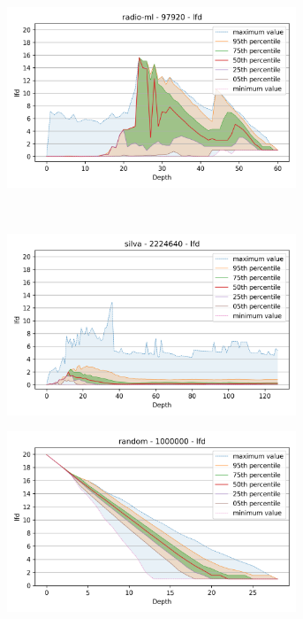 \begin{figure}
\begin{subfigure}[b]{0.47\textwidth}
    \label{fig:results:sift-lfd}
    \end{subfigure}%
    \begin{subfigure}[b]{0.47\textwidth}
    \includegraphics[width=0.95\textwidth]{images/lfd_plots/radio-ml-97920-lfd.png}\\
    \label{fig:results:radioml-lfd}
    \end{subfigure}%
    \\
    \begin{subfigure}[b]{0.47\textwidth}
    \includegraphics[width=0.95\textwidth]{images/lfd_plots/silva-2224640-lfd.png}\\
    \label{fig:results:silva-lfd}
    \end{subfigure}%
    \begin{subfigure}[b]{0.47\textwidth}
    \includegraphics[width=0.95\textwidth]{images/lfd_plots/random-1000000-lfd.png}\\

\end{subfigure}
\end{figure}
